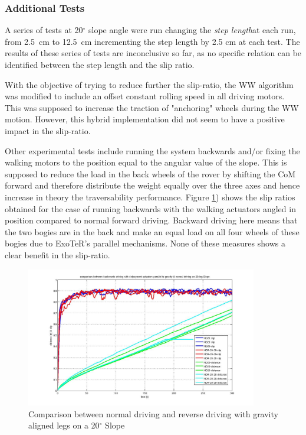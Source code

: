\documentclass[a4paper,twocolumn]{esapub2005} %
\begin{document}
\subsubsection*{Additional Tests}
A series of tests at 20$^{\circ}$ slope angle were run changing the \textit{step length}\footnotemark[3]
at each run, from 2.5~\unit{cm} to 12.5~\unit{cm} incrementing the step length by 2.5 cm at
each test. The results of these series of tests are inconclusive so far, as no
specific relation can be identified between the step length and the slip ratio.

With the objective of trying to reduce further the slip-ratio, the WW algorithm
was modified to include an offset constant rolling speed in all driving motors.
This was supposed to increase the traction of "anchoring" wheels during the WW
motion. However, this hybrid implementation did not seem to have a positive
impact in the slip-ratio.

Other experimental tests include running the system backwards and/or fixing the
walking motors to the position equal to the angular value of the slope. This is
supposed to reduce the load in the back wheels of the rover by shifting the CoM
forward and therefore distribute the weight equally over the three axes and
hence increase in theory the traversability performance. Figure
\ref{fig:ndr20d}) shows the slip ratios obtained for the case of running
backwards with the walking actuators angled in position compared to normal
forward driving. Backward driving here means that the two bogies are in the
back and make an equal load on all four wheels of these bogies due to ExoTeR's
parallel mechanisms. None of these measures shows a clear benefit in the slip-ratio.

\begin{figure}[h!]
    \centering
    \includegraphics[width=0.9\textwidth]{ndr20d.jpg}	\caption{Comparison between
    normal driving and reverse driving with gravity aligned legs on a 20$^{\circ}$ Slope}
    \label{fig:ndr20d}
\end{figure}
\end{document}
